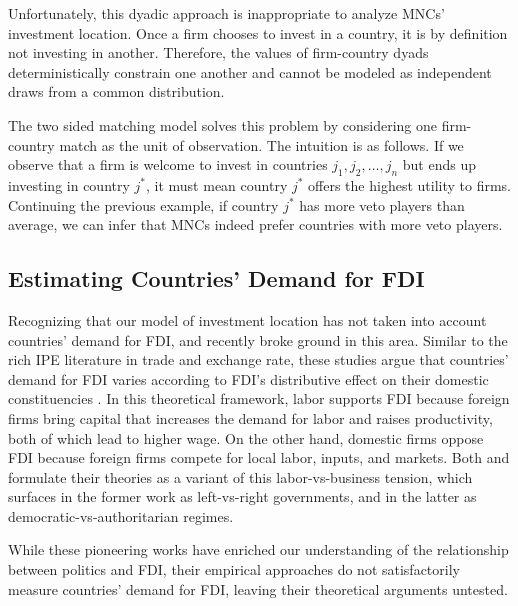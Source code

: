 Unfortunately, this dyadic approach is inappropriate to analyze MNCs' investment
location. Once a firm chooses to invest in a country, it is by definition not
investing in another. Therefore, the values of firm-country dyads
deterministically constrain one another and cannot be modeled as independent
draws from a common distribution.

The two sided matching model solves this problem by considering one firm-country
match as the unit of observation. The intuition is as follows. If we observe
that a firm is welcome to invest in countries $j_1, j_2, \dots, j_n$ but ends up
investing in country $j^*$, it must mean country $j^*$ offers the highest
utility to firms. Continuing the previous example, if country $j^*$ has more
veto players than average, we can infer that MNCs indeed prefer countries with
more veto players.

\subsection{Estimating Countries' Demand for FDI}

Recognizing that our model of investment location has not taken into account
countries' demand for FDI, \citet{Pinto2013} and \citet{Pandya2016} recently
broke ground in this area. Similar to the rich IPE literature in trade and
exchange rate, these studies argue that countries' demand for FDI varies
according to FDI's distributive effect on their domestic constituencies
\citep{Broz2001, Milner2005a}. In this theoretical framework, labor supports FDI
because foreign firms bring capital that increases the demand for labor and
raises productivity, both of which lead to higher wage. On the other hand,
domestic firms oppose FDI because foreign firms compete for local labor, inputs,
and markets. Both \citet{Pinto2013} and \citet{Pandya2016} formulate their
theories as a variant of this labor-vs-business tension, which surfaces in the
former work as left-vs-right governments, and in the latter as
democratic-vs-authoritarian regimes.

While these pioneering works have enriched our understanding of the relationship
between politics and FDI, their empirical approaches do not satisfactorily
measure countries' demand for FDI, leaving their theoretical arguments untested.

